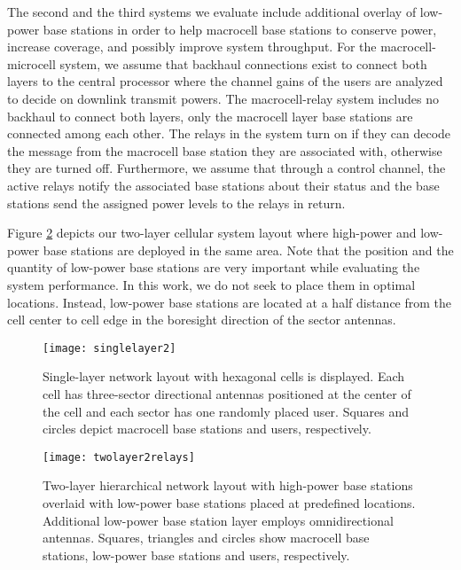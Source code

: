 \documentclass[conference,letterpaper,final,10pt]{IEEEtran}
\begin{document}
The second and the third systems we evaluate include additional overlay of low-power base stations in order to help macrocell base stations to conserve power, increase coverage, and possibly improve system throughput. For the macrocell-microcell system, we assume that backhaul connections exist to connect both layers to the central processor where the channel gains of the users are analyzed to decide on downlink transmit powers. The macrocell-relay system includes no backhaul to connect both layers, only the macrocell layer base stations are connected among each other. The relays in the system turn on if they can decode the message from the macrocell base station they are associated with, otherwise they are turned off. Furthermore, we assume that through a control channel, the active relays notify the associated base stations about their status and the base stations send the assigned power levels to the relays in return.

Figure \ref{twolayer_fig} depicts our two-layer cellular system layout where high-power and low-power base stations are deployed in the same area. Note that the position and the quantity of low-power base stations are very important while evaluating the system performance. In this work, we do not seek to place them in optimal locations. Instead, low-power base stations are located at a half distance from the cell center to cell edge in the boresight direction of the sector antennas.

\begin{figure}[tb!]\begin{center}
  \texttt{[image: singlelayer2]}\\ \caption{Single-layer network layout with  hexagonal cells is displayed. Each cell has three-sector   directional antennas positioned at the center of the cell and each sector has one randomly placed user. Squares and circles depict macrocell base stations and users, respectively.}\label{baseline_sector}\end{center}
\end{figure}

\begin{figure}[tb!]\begin{center}
  \texttt{[image: twolayer2relays]}\\\caption{Two-layer hierarchical network layout with  high-power base stations overlaid with  low-power base
    stations placed at predefined locations. Additional low-power base station layer employs omnidirectional antennas. Squares, triangles and circles show macrocell base stations, low-power base stations and users, respectively.}\label{twolayer_fig}\end{center}
\end{figure}
\end{document}
